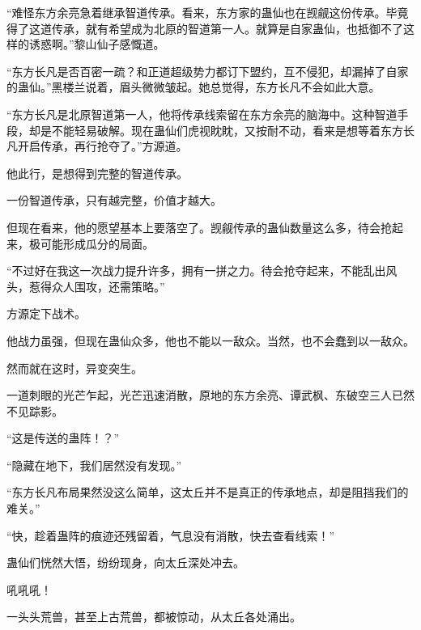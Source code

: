 \begin{this_body}
“难怪东方余亮急着继承智道传承。看来，东方家的蛊仙也在觊觎这份传承。毕竟得了这道传承，就有希望成为北原的智道第一人。就算是自家蛊仙，也抵御不了这样的诱惑啊。”黎山仙子感慨道。

“东方长凡是否百密一疏？和正道超级势力都订下盟约，互不侵犯，却漏掉了自家的蛊仙。”黑楼兰说着，眉头微微皱起。她总觉得，东方长凡不会如此大意。

“东方长凡是北原智道第一人，他将传承线索留在东方余亮的脑海中。这种智道手段，却是不能轻易破解。现在蛊仙们虎视眈眈，又按耐不动，看来是想等着东方长凡开启传承，再行抢夺了。”方源道。

他此行，是想得到完整的智道传承。

一份智道传承，只有越完整，价值才越大。

但现在看来，他的愿望基本上要落空了。觊觎传承的蛊仙数量这么多，待会抢起来，极可能形成瓜分的局面。

“不过好在我这一次战力提升许多，拥有一拼之力。待会抢夺起来，不能乱出风头，惹得众人围攻，还需策略。”

方源定下战术。

他战力虽强，但现在蛊仙众多，他也不能以一敌众。当然，也不会蠢到以一敌众。

然而就在这时，异变突生。

一道刺眼的光芒乍起，光芒迅速消散，原地的东方余亮、谭武枫、东破空三人已然不见踪影。

“这是传送的蛊阵！？”

“隐藏在地下，我们居然没有发现。”

“东方长凡布局果然没这么简单，这太丘并不是真正的传承地点，却是阻挡我们的难关。”

“快，趁着蛊阵的痕迹还残留着，气息没有消散，快去查看线索！”

蛊仙们恍然大悟，纷纷现身，向太丘深处冲去。

吼吼吼！

一头头荒兽，甚至上古荒兽，都被惊动，从太丘各处涌出。

\end{this_body}

